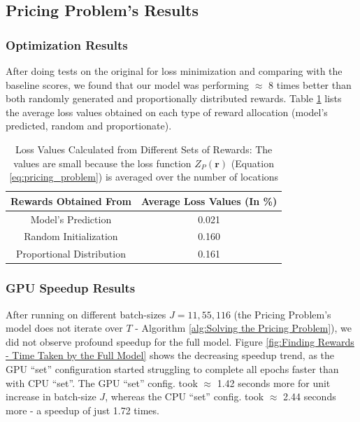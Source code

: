 \documentclass[12pt]{article}
\newcommand{\vect}[1]{\mathbf{#1}}  %
\begin{document}
    \subsection{Pricing Problem's Results} \label{sec:Pricing Problem's Results}
    \subsubsection{Optimization Results}
    After doing tests on the original for loss minimization and comparing with the baseline scores, we found that our model was performing $\approx$ 8 times better than both randomly generated and proportionally distributed rewards. Table \ref{tab:Loss Values Calculated from Different Sets of Rewards} lists the average loss values obtained on each type of reward allocation (model's predicted, random and proportionate).
    \begin{table}[!htbp]
        \centering
        \caption[Loss Values Calculated from Different Sets of Rewards]{Loss Values Calculated from Different Sets of Rewards: The values are small because the loss function $Z_P(\vect{r})$ (Equation \ref{eq:pricing_problem}) is averaged over the number of locations}
        \label{tab:Loss Values Calculated from Different Sets of Rewards}
        \begin{tabular}{|c|c|}
            \hline
            \textbf{Rewards Obtained From} & \textbf{Average Loss Values (In \%)}\\
            \hline
            Model's Prediction & 0.021\\
            Random Initialization & 0.160\\
            Proportional Distribution & 0.161\\
            \hline
        \end{tabular}
    \end{table}
    
    \subsubsection{GPU Speedup Results}
    After running on different batch-sizes $J = 11, 55, 116$ (the Pricing Problem's model does not iterate over $T$ - Algorithm \ref{alg:Solving the Pricing Problem}), we did not observe profound speedup for the full model. Figure \ref{fig:Finding Rewards - Time Taken by the Full Model} shows the decreasing speedup trend, as the GPU ``set'' configuration started struggling to complete all epochs faster than with CPU ``set''. The GPU ``set'' config. took $\approx$ 1.42 seconds more for unit increase in batch-size $J$, whereas the CPU ``set'' config. took $\approx$ 2.44 seconds more - a speedup of just 1.72 times.
    
\end{document}
